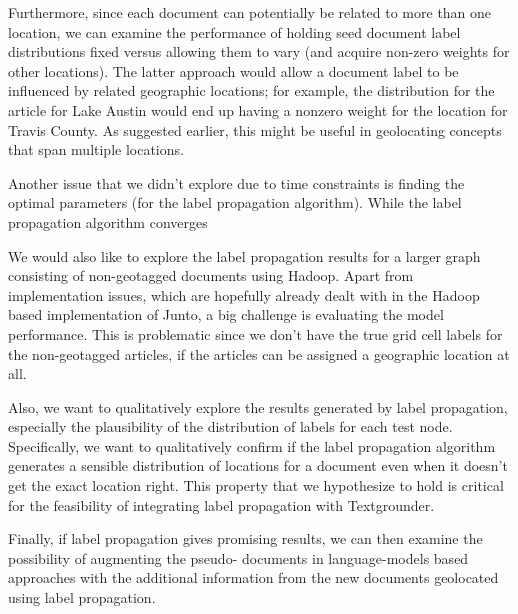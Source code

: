 
\par Furthermore, since each document can potentially be related to more than
one location, we can examine the performance of holding seed document label
distributions fixed versus allowing them to vary (and acquire non-zero weights
for other locations). The latter approach would allow a document label to be
influenced by related geographic locations;  for example, the distribution for
the article for Lake Austin would end up having a nonzero weight for the
location for Travis County. As suggested earlier, this might be useful in
geolocating concepts that span multiple locations.


\par Another issue that we didn't explore due to time constraints is finding
the optimal parameters (for the label propagation algorithm). While the label
propagation algorithm converges 

\par We would also like to explore the label propagation results for a larger
graph consisting of non-geotagged documents using Hadoop. Apart from
implementation issues, which are hopefully already dealt with in the Hadoop
based implementation of Junto, a big challenge is evaluating the model
performance. This is problematic since we don't have the true grid cell labels
for the non-geotagged articles, if the articles can be assigned a geographic
location at all.

\par Also, we want to qualitatively explore the results generated by label
propagation, especially the plausibility  of the distribution of labels for each test node.
Specifically, we want to qualitatively confirm if the label propagation
algorithm generates a sensible distribution of locations for a document even
when it doesn't get the exact location right. This property that we hypothesize
to hold is critical for the feasibility of integrating label propagation with
Textgrounder.

\par Finally, if label propagation
gives promising results, we can then examine the possibility of augmenting the
pseudo- documents in language-models based approaches with the additional
information from the new documents geolocated using label propagation.

